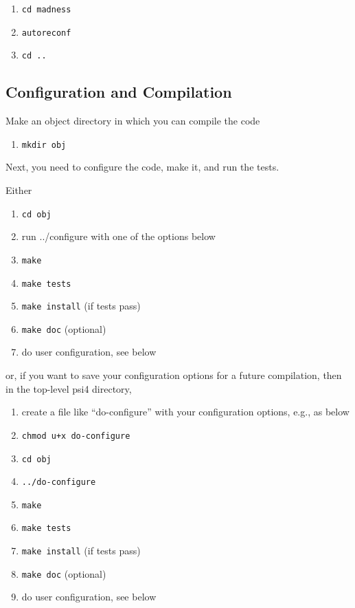 \documentclass[12pt]{article}
\begin{document}
\begin{enumerate}
\item {\tt cd madness}
\item {\tt autoreconf}
\item {\tt cd ..}
\end{enumerate}

\subsection{Configuration and Compilation}

Make an object directory in which you can compile the code
\begin{enumerate}
\item {\tt mkdir obj}
\end{enumerate}

\noindent
Next, you need to configure the code, make it, and run the tests.

\noindent
Either

\begin{enumerate}
\item {\tt cd obj}
\item run ../configure with one of the options below
\item {\tt make}
\item {\tt make tests}
\item {\tt make install} (if tests pass)
\item {\tt make doc} (optional)
\item do user configuration, see below
\end{enumerate}

\noindent
or, if you want to save your configuration options for a future compilation,
then in the top-level psi4 directory,
\begin{enumerate}
\item create a file like ``do-configure'' with your configuration options,
      e.g., as below
\item {\tt chmod u+x do-configure}
\item {\tt cd obj}
\item {\tt ../do-configure}
\item {\tt make}
\item {\tt make tests}
\item {\tt make install} (if tests pass)
\item {\tt make doc} (optional)
\item do user configuration, see below
\end{enumerate}
\end{document}

